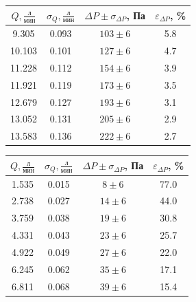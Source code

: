 \documentclass[a4paper]{article}
\begin{document}
\begin{enumerate}
\begin{multicols}{2}
\begin{center}
    \begin{tabular}{|c|c|c|c|}
        \hline
        $Q, \frac{\text{л}}{\text{мин}}$ & $\sigma_Q, \frac{\text{л}}{\text{мин}}$ & $\Delta P \pm \sigma_{\Delta P}$, Па & $\varepsilon_{\Delta P}$, \% \\
        \hline
        9.305 & 0.093 & $103 \pm 6$ & 5.8 \\ \hline
        10.103 & 0.101 & $127 \pm 6$ & 4.7 \\ \hline
        11.228 & 0.112 & $154 \pm 6$ & 3.9 \\ \hline
        11.921 & 0.119 & $173 \pm 6$ & 3.5 \\ \hline
        12.679 & 0.127 & $193 \pm 6$ & 3.1 \\ \hline
        13.052 & 0.131 & $205 \pm 6$ & 2.9 \\ \hline
        13.583 & 0.136 & $222 \pm 6$ & 2.7 \\ \hline
    \end{tabular}
\end{center}
\vspace{1em}
\end{multicols}
\begin{multicols}{2}
\begin{center}
    \begin{tabular}{|c|c|c|c|}
        \hline
         $Q, \frac{\text{л}}{\text{мин}} $& $\sigma_Q, \frac{\text{л}}{\text{мин}} $& $\Delta P \pm \sigma_{\Delta P}$, Па & $\varepsilon_{\Delta P}$, \% \\
        \hline
        1.535 & 0.015 & $8 \pm 6$ & 77.0 \\ \hline
        2.738 & 0.027 & $14 \pm 6$ & 44.0 \\ \hline
        3.759 & 0.038 & $19 \pm 6$ & 30.8 \\ \hline
        4.331 & 0.043 & $23 \pm 6$ & 25.7 \\ \hline
        4.922 & 0.049 & $27 \pm 6$ & 22.0 \\ \hline
        6.245 & 0.062 & $35 \pm 6$ & 17.1 \\ \hline
        6.811 & 0.068 & $39 \pm 6$ & 15.4 \\ \hline
    \end{tabular}
\end{center}
\vspace{1em}
\begin{center}

\end{center}
\end{multicols}
\end{enumerate}
\end{document}
